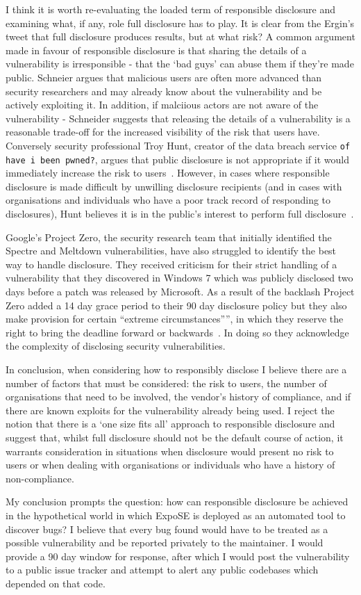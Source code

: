 \documentclass[]{final_report}
\begin{document}
I think it is worth re-evaluating the loaded term of responsible disclosure and examining what, if any, role full disclosure has to play. It is clear from the Ergin's tweet that full disclosure produces results, but at what risk? A common argument made in favour of responsible disclosure is that sharing the details of a vulnerability is irresponsible - that the `bad guys' can abuse them if they're made public. Schneier argues that malicious users are often more advanced than security researchers and may already know about the vulnerability and be actively exploiting it. In addition, if malciious actors are not aware of the vulnerability - Schneider suggests that releasing the details of a vulnerability is a reasonable trade-off for the increased visibility of the risk that users have. Conversely security professional Troy Hunt, creator of the data breach service \lstinline{of have i been pwned?}, argues that public disclosure is not appropriate if it would immediately increase the risk to users~\cite{responsibility-of-public-disclosure}. However, in cases where responsible disclosure is made difficult by unwilling disclosure recipients (and in cases with organisations and individuals who have a poor track record of responding to disclosures), Hunt believes it is in the public's interest to perform full disclosure~\cite{kids-pass-responsible-disclosure}.

Google's Project Zero, the security research team that initially identified the Spectre and Meltdown vulnerabilities, have also struggled to identify the best way to handle disclosure. They received criticism for their strict handling of a vulnerability that they discovered in Windows 7 which was publicly disclosed two days before a patch was released by Microsoft. As a result of the backlash Project Zero added a 14 day grace period to their 90 day disclosure policy but they also make provision for certain ``extreme circumstances””, in which they reserve the right to bring the deadline forward or backwards~\cite{project-zero-update-policy}. In doing so they acknowledge the complexity of disclosing security vulnerabilities.

In conclusion, when considering how to responsibly disclose I believe there are a number of factors that must be considered: the risk to users, the number of organisations that need to be involved, the vendor's history of compliance, and if there are known exploits for the vulnerability already being used. I reject the notion that there is a `one size fits all' approach to responsible disclosure and suggest that, whilst full disclosure should not be the default course of action, it warrants consideration in situations when disclosure would present no risk to users or when dealing with organisations or individuals who have a history of non-compliance.

My conclusion prompts the question: how can responsible disclosure be achieved in the hypothetical world in which ExpoSE is deployed as an automated tool to discover bugs? I believe that every bug found would have to be treated as a possible vulnerability and be reported privately to the maintainer. I would provide a 90 day window for response, after which I would post the vulnerability to a public issue tracker and attempt to alert any public codebases which depended on that code.
\end{document}
